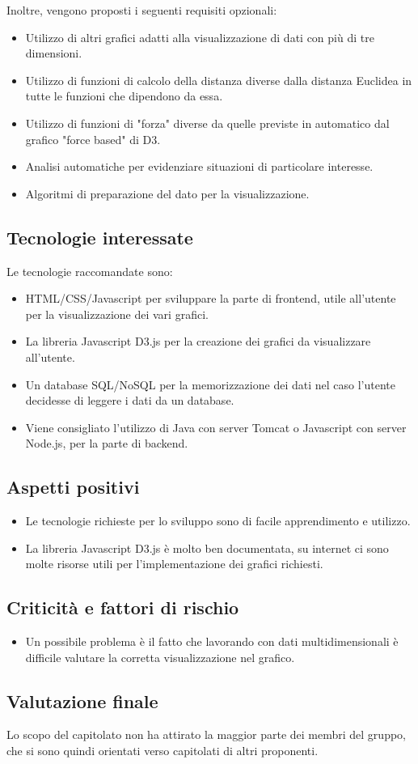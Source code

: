 Inoltre, vengono proposti i seguenti requisiti opzionali:
\begin{itemize}
\item Utilizzo di altri grafici adatti alla visualizzazione di dati con più di tre dimensioni.
\item Utilizzo di funzioni di calcolo della distanza diverse dalla distanza Euclidea in tutte le funzioni che dipendono da essa.
\item Utilizzo di funzioni di "forza" diverse da quelle previste in automatico dal grafico "force based" di D3.
\item Analisi automatiche per evidenziare situazioni di particolare interesse.
\item Algoritmi di preparazione del dato per la visualizzazione.
\end{itemize}

\subsection{Tecnologie interessate}
Le tecnologie raccomandate sono:
\begin{itemize}
\item HTML/CSS/Javascript per sviluppare la parte di frontend, utile all’utente per la visualizzazione dei vari grafici.
\item La libreria Javascript D3.js per la creazione dei grafici da visualizzare all'utente.
\item Un database SQL/NoSQL per la memorizzazione dei dati nel caso l’utente decidesse di leggere i dati da un database.
\item Viene consigliato l’utilizzo di Java con server Tomcat o Javascript con server Node.js, per la parte di backend.
\end{itemize}

\subsection{Aspetti positivi}
\begin{itemize}
\item Le tecnologie richieste per lo sviluppo sono di facile apprendimento e utilizzo.
\item La libreria Javascript D3.js è molto ben documentata, su internet ci sono molte risorse utili per l'implementazione dei grafici richiesti.
\end{itemize}

\subsection{Criticità e fattori di rischio}
\begin{itemize}
\item Un possibile problema è il fatto che lavorando con dati multidimensionali è difficile valutare la corretta visualizzazione nel grafico.
\end{itemize}

\subsection{Valutazione finale}
Lo scopo del capitolato non ha attirato la maggior parte dei membri del gruppo, che si sono quindi orientati verso capitolati di altri proponenti.